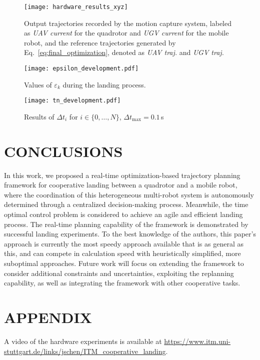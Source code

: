 \documentclass[conference,preprint]{IEEEtran}
\begin{document}
\begin{figure}[htpb]
  \centering
  \texttt{[image: hardware\_results\_xyz]}
  \caption{Output trajectories recorded by the motion capture system, labeled as \textit{UAV current} for the quadrotor and \textit{UGV current} for the mobile robot, and the reference trajectories generated by Eq.~\eqref{eq:final_optimization}, denoted as \textit{UAV traj.} and \textit{UGV traj.}}
  \label{fig:output_trajectories}
\end{figure}    

\begin{figure}[htpb]
  \centering
  \texttt{[image: epsilon\_development.pdf]}
  \caption{Values of $\varepsilon_k$ during the landing process.}
  \label{fig:epsilon_development}
\end{figure}   

\begin{figure}[htpb!]
  \centering
  \texttt{[image: tn\_development.pdf]}
  \caption{Results of $\Delta t_i$ for $i \in {\{0, \ldots, N}\}$, $\Delta t_\text{max}=0.1$\,s}
  \label{fig:tn_development}
\end{figure}    



\section{CONCLUSIONS}
\label{sec:conclusion}
In this work, we proposed a real-time optimization-based trajectory planning framework for cooperative landing between a quadrotor and a mobile robot, where the coordination of this heterogeneous multi-robot system is autonomously determined through a centralized decision-making process. Meanwhile, the time optimal control problem is considered to achieve an agile and efficient landing process.
The real-time planning capability of the framework is demonstrated by successful landing experiments. 
To the best knowledge of the authors, this paper's approach is currently the most speedy approach available that is as general as this, and can compete in calculation speed with heuristically simplified, more suboptimal approaches.
Future work will focus on extending the framework to consider additional constraints and uncertainties, exploiting the replanning capability, as well as integrating the framework with other cooperative tasks.

\section*{APPENDIX}
A video of the hardware experiments is available at \url{https://www.itm.uni-stuttgart.de/links/jschen/ITM_cooperative_landing}.
\end{document}
